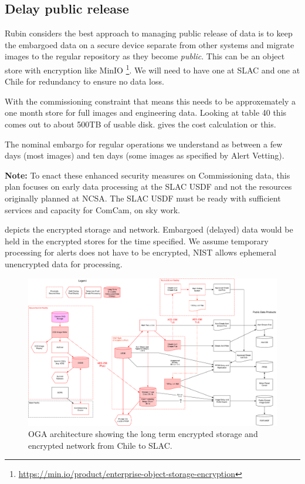 
\subsection{Delay public release} \label{sec:3delay}

Rubin considers the best approach to managing public release of data is to keep the embargoed data on a secure device separate from other systems and migrate images to the regular repository as they become \emph{public}.
This can be an object store with encryption like MinIO \footnote{\url{ https://min.io/product/enterprise-object-storage-encryption}}.
We will need to have one at \gls{SLAC} and one at Chile for redundancy to ensure no data loss.

With the commissioning constraint that means this needs to be approxemately a one month store  for full images and engineering data.
Looking at 
table 40 this comes out to about 500TB of usable disk.
 gives the cost calculation or this.

The nominal embargo for regular operations we understand as between a few days (most images) and ten days (some images as specified by \gls{Alert} Vetting).




{\bf Note:} To enact these enhanced security measures on \gls{Commissioning} data, this plan focuses on early data processing at the SLAC USDF and not the resources originally planned at NCSA. The SLAC USDF must be ready with sufficient services and capacity for ComCam, on sky work.

 depicts the encrypted storage and network. Embargoed (delayed) data would be held in the encrypted stores for the time specified.
We assume temporary processing for alerts does not have to be encrypted, \gls{NIST} allows ephemeral unencrypted data for processing.

\begin{figure}
\begin{centering}
\includegraphics[width=\textwidth]{OGA_Diagram}
	\caption{ \gls{OGA} architecture  showing the long term encrypted storage and encrypted network from Chile to SLAC. \label{fig:arch}}
\end{centering}
\end{figure}
